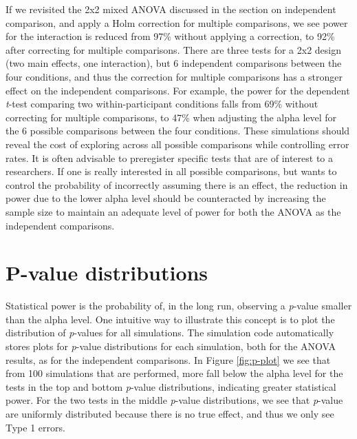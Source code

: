 \documentclass[,jou, draftfirst, a4paper,floatsintext]{apa6}
\begin{document}
If we revisited the 2x2 mixed ANOVA discussed in the section on independent comparison, and apply a Holm correction for multiple comparisons, we see power for the interaction is reduced from 97\% without applying a correction, to 92\% after correcting for multiple comparisons.
There are three tests for a 2x2 design (two main effects, one interaction), but 6 independent comparisons between the four conditions, and thus the correction for multiple comparisons has a stronger effect on the independent comparisons.
For example, the power for the dependent \emph{t}-test comparing two within-participant conditions falls from 69\% without correcting for multiple comparisons, to 47\% when adjusting the alpha level for the 6 possible comparisons between the four conditions.
These simulations should reveal the cost of exploring across all possible comparisons while controlling error rates.
It is often advisable to preregister specific tests that are of interest to a researchers.
If one is really interested in all possible comparisons, but wants to control the probability of incorrectly assuming there is an effect, the reduction in power due to the lower alpha level should be counteracted by increasing the sample size to maintain an adequate level of power for both the ANOVA as the independent comparisons.

\hypertarget{p-value-distributions}{%
\section{P-value distributions}\label{p-value-distributions}}

Statistical power is the probability of, in the long run, observing a \emph{p}-value smaller than the alpha level.
One intuitive way to illustrate this concept is to plot the distribution of \emph{p}-values for all simulations.
The simulation code automatically stores plots for \emph{p}-value distributions for each simulation, both for the ANOVA results, as for the independent comparisons.
In Figure \ref{fig:p-plot} we see that from 100 simulations that are performed, more fall below the alpha level for the tests in the top and bottom \emph{p}-value distributions, indicating greater statistical power.
For the two tests in the middle \emph{p}-value distributions, we see that \emph{p}-value are uniformly distributed because there is no true effect, and thus we only see Type 1 errors.
\end{document}
